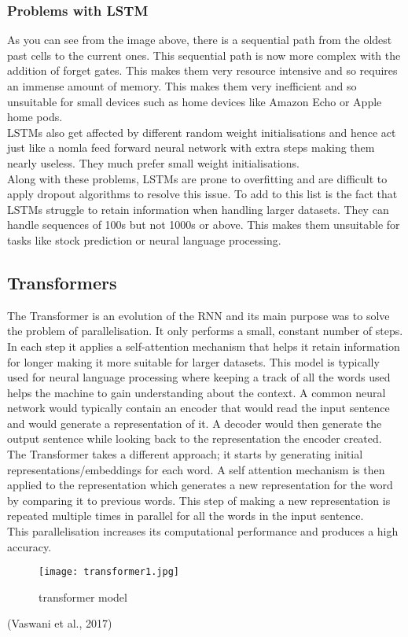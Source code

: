 \documentclass{article}
\begin{document}
\subsubsection{Problems with LSTM}
As you can see from the image above, there is a sequential path from the oldest past cells to the
current ones. This sequential path is now more complex with the addition of forget gates. This
makes them very resource intensive and so requires an immense amount of memory. This makes
them very inefficient and so unsuitable for small devices such as home devices like Amazon
Echo or Apple home pods.\\
LSTMs also get affected by different random weight initialisations and hence act just like a nomla
feed forward neural network with extra steps making them nearly useless. They much prefer
small weight initialisations.\\
Along with these problems, LSTMs are prone to overfitting and are difficult to apply dropout
algorithms to resolve this issue. To add to this list is the fact that LSTMs struggle to retain
information when handling larger datasets. They can handle sequences of 100s but not 1000s or above. This makes them unsuitable for tasks like stock prediction or neural language processing.

\subsection{Transformers}
The Transformer is an evolution of the RNN and its main purpose was to solve the problem of
parallelisation. It only performs a small, constant number of steps. In each step it applies a
self-attention mechanism that helps it retain information for longer making it more suitable for
larger datasets. This model is typically used for neural language processing where keeping a
track of all the words used helps the machine to gain understanding about the context. A
common neural network would typically contain an encoder that would read the input sentence
and would generate a representation of it. A decoder would then generate the output sentence
while looking back to the representation the encoder created. The Transformer takes a different
approach; it starts by generating initial representations/embeddings for each word. A self
attention mechanism is then applied to the representation which generates a new representation
for the word by comparing it to previous words. This step of making a new representation is
repeated multiple times in parallel for all the words in the input sentence.\\
This parallelisation increases its computational performance and produces a high accuracy.
\begin{figure}[h!]
    \centering
    \texttt{[image: transformer1.jpg]}
    \caption{transformer model}
\end{figure}
(Vaswani et al., 2017)
\end{document}
